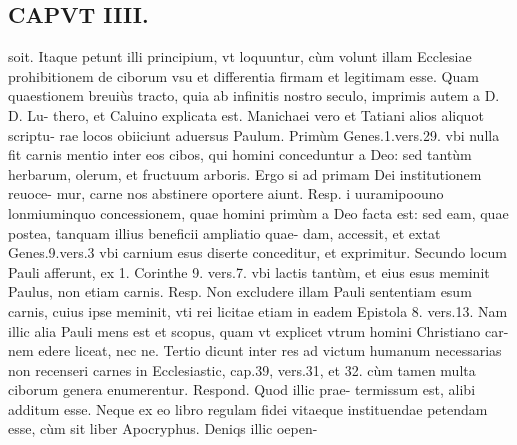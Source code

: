 \documentclass{article}
\begin{document}
\begin{pages}
\section*{CAPVT  IIII. }\pstart soit. Itaque petunt illi principium, vt loquuntur, cùm volunt illam Ecclesiae prohibitionem de ciborum vsu et differentia firmam et legitimam esse. Quam quaestionem breuiùs tracto, quia ab infinitis nostro seculo, imprimis autem a D. D. Lu- thero, et Caluino explicata est.  \pend\pstart Manichaei vero et Tatiani alios aliquot scriptu- rae locos obiiciunt aduersus Paulum. Primùm Genes.1.vers.29. vbi nulla fit carnis mentio inter eos cibos, qui homini conceduntur a Deo: sed tantùm herbarum, olerum, et fructuum arboris. Ergo si ad primam Dei institutionem reuoce- mur, carne nos abstinere oportere aiunt. Resp. i uuramipoouno lonmiuminquo concessionem, quae homini primùm a Deo facta est: sed eam, quae postea, tanquam illius beneficii ampliatio quae- dam, accessit, et extat Genes.9.vers.3 vbi carnium esus diserte conceditur, et exprimitur.  \pend\pstart Secundo locum Pauli afferunt, ex 1. Corinthe 9. vers.7. vbi lactis tantùm, et eius esus meminit Paulus, non etiam carnis. Resp. Non excludere illam Pauli sententiam esum carnis, cuius ipse meminit, vti rei licitae etiam in eadem Epistola 8. vers.13. Nam illic alia Pauli mens est et scopus, quam vt explicet vtrum homini Christiano car- nem edere liceat, nec ne.  \pend\pstart Tertio dicunt inter res ad victum humanum necessarias non recenseri carnes in Ecclesiastic, cap.39, vers.31, et 32. cùm tamen multa ciborum genera enumerentur. Respond. Quod illic prae- termissum est, alibi additum esse. Neque ex eo libro regulam fidei vitaeque instituendae petendam esse, cùm sit liber Apocryphus. Deniqs illic oepen-  \pend

\end{pages}
\end{document}
